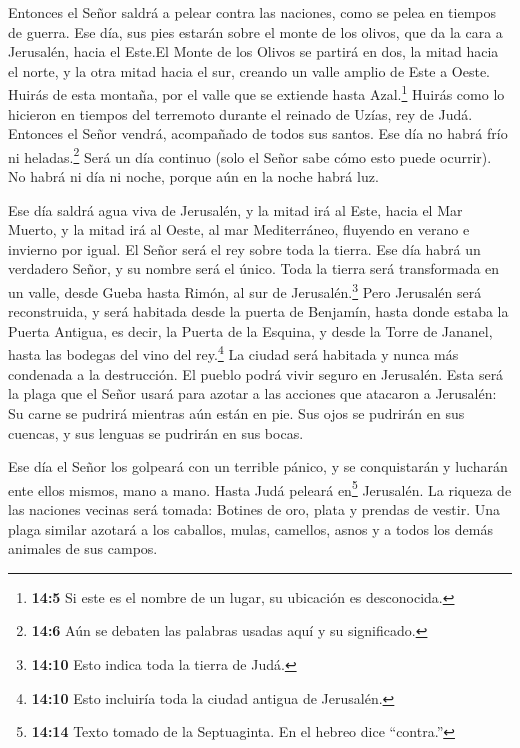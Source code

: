  Entonces el Señor saldrá a pelear contra las naciones, como
se pelea en tiempos de guerra.  Ese día, sus pies estarán
sobre el monte de los olivos, que da la cara a Jerusalén, hacia el
Este.El Monte de los Olivos se partirá en dos, la mitad hacia el norte,
y la otra mitad hacia el sur, creando un valle amplio de Este a Oeste.
 Huirás de esta montaña, por el valle que se extiende hasta
Azal.\footnote{\textbf{14:5} Si este es el nombre de un lugar, su
  ubicación es desconocida.} Huirás como lo hicieron en tiempos del
terremoto durante el reinado de Uzías, rey de Judá. Entonces el Señor
vendrá, acompañado de todos sus santos.  Ese día no habrá
frío ni heladas.\footnote{\textbf{14:6} Aún se debaten las palabras
  usadas aquí y su significado.}  Será un día continuo (solo
el Señor sabe cómo esto puede ocurrir). No habrá ni día ni noche, porque
aún en la noche habrá luz.

 Ese día saldrá agua viva de Jerusalén, y la mitad irá al
Este, hacia el Mar Muerto, y la mitad irá al Oeste, al mar Mediterráneo,
fluyendo en verano e invierno por igual.  El Señor será el
rey sobre toda la tierra. Ese día habrá un verdadero Señor, y su nombre
será el único.  Toda la tierra será transformada en un
valle, desde Gueba hasta Rimón, al sur de Jerusalén.\footnote{\textbf{14:10}
  Esto indica toda la tierra de Judá.} Pero Jerusalén será reconstruida,
y será habitada desde la puerta de Benjamín, hasta donde estaba la
Puerta Antigua, es decir, la Puerta de la Esquina, y desde la Torre de
Jananel, hasta las bodegas del vino del rey.\footnote{\textbf{14:10}
  Esto incluiría toda la ciudad antigua de Jerusalén.}  La
ciudad será habitada y nunca más condenada a la destrucción. El pueblo
podrá vivir seguro en Jerusalén.  Esta será la plaga que el
Señor usará para azotar a las acciones que atacaron a Jerusalén: Su
carne se pudrirá mientras aún están en pie. Sus ojos se pudrirán en sus
cuencas, y sus lenguas se pudrirán en sus bocas.

 Ese día el Señor los golpeará con un terrible pánico, y se
conquistarán y lucharán ente ellos mismos, mano a mano. 
Hasta Judá peleará en\footnote{\textbf{14:14} Texto tomado de la
  Septuaginta. En el hebreo dice ``contra.''} Jerusalén. La riqueza de
las naciones vecinas será tomada: Botines de oro, plata y prendas de
vestir.  Una plaga similar azotará a los caballos, mulas,
camellos, asnos y a todos los demás animales de sus campos.

